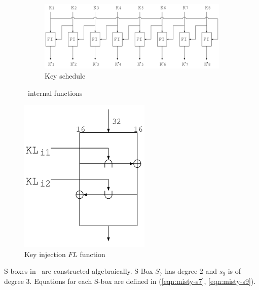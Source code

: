 \begin{figure}[p]
    \begin{subfigure}[b]{\textwidth}
        \vspace{1em}
        \centering
        \includegraphics[scale=0.5]{images/misty_key_schedule}
        \caption{Key schedule}
        \label{fig:misty_key_schedule}
    \end{subfigure}
    \caption{\misty\ internal functions}
    \label{fig:misty_round_funcs}
\end{figure}

\begin{figure}[p]
    \centering
    \includegraphics[scale=0.5]{images/misty_fl}
    \caption{Key injection $FL$ function}
    \label{fig:misty_fl}
\end{figure}

S-boxes in \misty\ are constructed algebraically. S-Box $S_7$ has degree $2$ and
$s_9$ is of degree 3. Equations for each S-box are defined in
(\ref{eqn:misty-s7}, \ref{eqn:misty-s9}).

